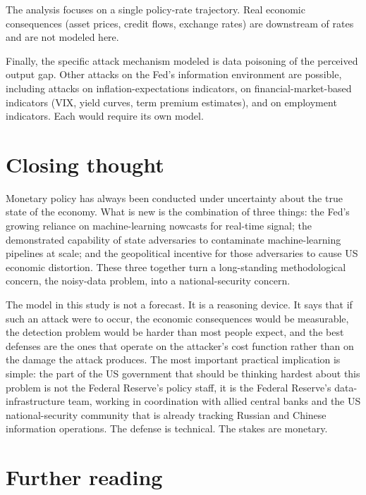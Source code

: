 \documentclass[12pt]{article}
\begin{document}
The analysis focuses on a single policy-rate trajectory. Real economic consequences (asset prices, credit flows, exchange rates) are downstream of rates and are not modeled here.

Finally, the specific attack mechanism modeled is data poisoning of the perceived output gap. Other attacks on the Fed's information environment are possible, including attacks on inflation-expectations indicators, on financial-market-based indicators (VIX, yield curves, term premium estimates), and on employment indicators. Each would require its own model.

\section{Closing thought}

Monetary policy has always been conducted under uncertainty about the true state of the economy. What is new is the combination of three things: the Fed's growing reliance on machine-learning nowcasts for real-time signal; the demonstrated capability of state adversaries to contaminate machine-learning pipelines at scale; and the geopolitical incentive for those adversaries to cause US economic distortion. These three together turn a long-standing methodological concern, the noisy-data problem, into a national-security concern.

The model in this study is not a forecast. It is a reasoning device. It says that if such an attack were to occur, the economic consequences would be measurable, the detection problem would be harder than most people expect, and the best defenses are the ones that operate on the attacker's cost function rather than on the damage the attack produces. The most important practical implication is simple: the part of the US government that should be thinking hardest about this problem is not the Federal Reserve's policy staff, it is the Federal Reserve's data-infrastructure team, working in coordination with allied central banks and the US national-security community that is already tracking Russian and Chinese information operations. The defense is technical. The stakes are monetary.

\section*{Further reading}
\end{document}
